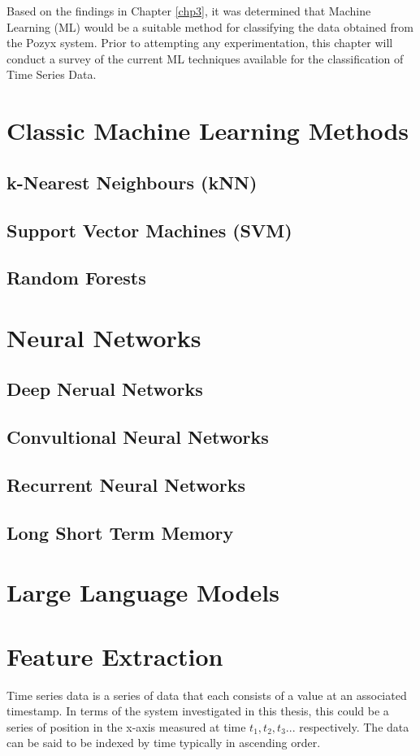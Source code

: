 Based on the findings in Chapter \ref{chp3}, it was determined that Machine Learning (ML) would be a suitable method for classifying the data obtained from the Pozyx system. Prior to attempting any experimentation, this chapter will conduct a survey of the current ML techniques available for the classification of Time Series Data.


\section{Classic Machine Learning Methods}
\subsection{k-Nearest Neighbours (kNN)}
\subsection{Support Vector Machines (SVM)}
\subsection{Random Forests}

\section{Neural Networks}
\subsection{Deep Nerual Networks}
\subsection{Convultional Neural Networks}
\subsection{Recurrent Neural Networks}
\subsection{Long Short Term Memory}

\section{Large Language Models}


\section{Feature Extraction}
Time series data is a series of data that each consists of a value at an associated timestamp. In terms of the system investigated in this thesis, this could be a series of position in the x-axis measured at time $t_1, t_2, t_3...$ respectively. The data can be said to be indexed by time \cite{yinPredictionAnalysisTime2023} typically in ascending order.


